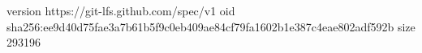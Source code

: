 version https://git-lfs.github.com/spec/v1
oid sha256:ee9d40d75fae3a7b61b5f9c0eb409ae84cf79fa1602b1e387c4eae802adf592b
size 293196
